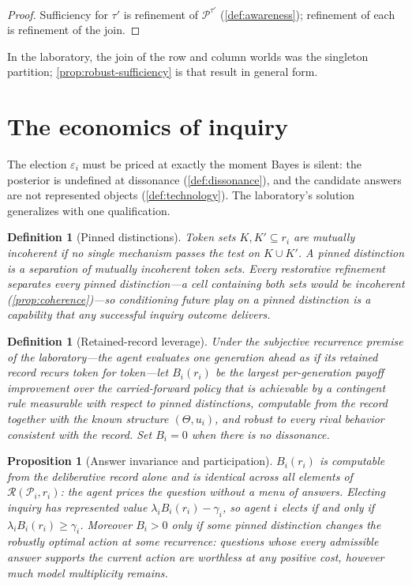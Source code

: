 \documentclass[11pt]{article}
\newtheorem{definition}[assumption]{Definition}
\newtheorem{proposition}[assumption]{Proposition}
\begin{document}
\begin{proof}
Sufficiency for $\tau'$ is refinement of $\mathcal P^{\tau'}$
(\cref{def:awareness}); refinement of each is refinement of the join.
\end{proof}

In the laboratory, the join of the row and column worlds was the singleton
partition; \cref{prop:robust-sufficiency} is that result in general form.

\section{The economics of inquiry}
\label{sec:inquiry-economics}

The election $\varepsilon_i$ must be priced at exactly the moment Bayes is
silent: the posterior is undefined at dissonance
(\cref{def:dissonance}), and the candidate answers are not represented
objects (\cref{def:technology}).  The laboratory's solution generalizes with
one qualification.

\begin{definition}[Pinned distinctions]
\label{def:pinned}
Token sets $K,K'\subseteq r_i$ are \emph{mutually incoherent} if no single
mechanism passes the test on $K\cup K'$.  A \emph{pinned distinction} is a
separation of mutually incoherent token sets.  Every restorative refinement
separates every pinned distinction---a cell containing both sets would be
incoherent (\cref{prop:coherence})---so conditioning future play on a pinned
distinction is a capability that \emph{any} successful inquiry outcome
delivers.
\end{definition}

\begin{definition}[Retained-record leverage]
\label{def:leverage}
Under the subjective recurrence premise of the laboratory---the agent
evaluates one generation ahead as if its retained record recurs token for
token---let $B_i(r_i)$ be the largest per-generation payoff improvement over
the carried-forward policy that is achievable by a contingent rule measurable
with respect to pinned distinctions, computable from the record together with
the known structure $(\Theta,u_i)$, and robust to every rival behavior
consistent with the record.  Set $B_i=0$ when there is no dissonance.
\end{definition}

\begin{proposition}[Answer invariance and participation]
\label{prop:participation}
$B_i(r_i)$ is computable from the deliberative record alone and is identical
across all elements of $\mathcal R(\mathcal P_i,r_i)$: the agent prices the
question without a menu of answers.  Electing inquiry has represented value
$\lambda_iB_i(r_i)-\gamma_i$, so agent $i$ elects if and only if
$\lambda_iB_i(r_i)\geq\gamma_i$.  Moreover $B_i>0$ only if some pinned
distinction changes the robustly optimal action at some recurrence: questions
whose every admissible answer supports the current action are worthless at any
positive cost, however much model multiplicity remains.
\end{proposition}
\end{document}
